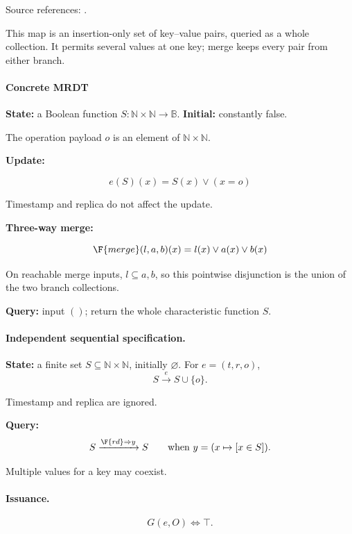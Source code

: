\noindent Source references: \cite{shapiro2011comprehensive}.





This map is an insertion-only set of key--value pairs, queried as a whole collection. It permits several values at one key; merge keeps every pair from either branch.

\paragraph{Concrete MRDT}
\textbf{State:} a Boolean function $S:\mathbb{N}\times\mathbb{N}\to\mathbb B$. \textbf{Initial:} constantly false.

The operation payload $o$ is an element of $\mathbb{N}\times\mathbb{N}$.

\textbf{Update:}

\[
e(S)(x)=S(x)\lor(x=o)
\]


Timestamp and replica do not affect the update.

\textbf{Three-way merge:}

\[
\F{merge}(l,a,b)(x)=l(x)\lor a(x)\lor b(x)
\]


On reachable merge inputs, $l\subseteq a,b$, so this pointwise disjunction
is the union of the two branch collections.

\textbf{Query:} input $()$; return the whole characteristic function $S$.

\paragraph{Independent sequential specification.}
\textbf{State:} a finite set $S\subseteq\mathbb N\times\mathbb N$, initially $\varnothing$. For $e=(t,r,o)$,
\[
S\xrightarrow{e}S\cup\{o\}.
\]

Timestamp and replica are ignored.

\textbf{Query:}
\[
S\xrightarrow{\F{rd}\Rightarrow y}S\qquad\text{when }y=(x\mapsto[x\in S]).
\]

Multiple values for a key may coexist.


\paragraph{Issuance.}
\[
G(e,O)\iff\top.
\]

